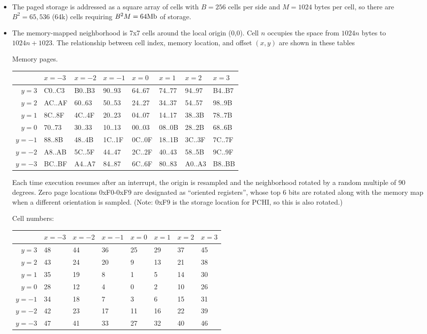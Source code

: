 \documentclass{article}
\begin{document}
  
  \begin{itemize}
  \item The paged storage is addressed as a square array of cells
    with $B=256$ cells per side and $M=1024$ bytes per cell,
    so there are $B^2 = 65,536$ (64k) cells requiring $B^2 M = 64\mathrm{Mb}$ of storage.
  \item The memory-mapped neighborhood is 7x7 cells around the local origin (0,0).
    Cell $n$ occupies the space from $1024n$ bytes to $1024n+1023$.
    The relationship between cell index, memory location, and offset $(x,y)$ are shown in these tables

    \noindent
    Memory pages.

    \noindent
 \begin{tabular}{r|lllllll}
        & $x=-3$ & $x=-2$ & $x=-1$ & $x=0$ & $x=1$ & $x=2$ & $x=3$ \\ \hline
 $y=3$ & C0..C3 & B0..B3 & 90..93 & 64..67 & 74..77 & 94..97 & B4..B7 \\
 $y=2$ & AC..AF & 60..63 & 50..53 & 24..27 & 34..37 & 54..57 & 98..9B \\
 $y=1$ & 8C..8F & 4C..4F & 20..23 & 04..07 & 14..17 & 38..3B & 78..7B \\
 $y=0$ & 70..73 & 30..33 & 10..13 & 00..03 & 08..0B & 28..2B & 68..6B \\
$y=-1$ & 88..8B & 48..4B & 1C..1F & 0C..0F & 18..1B & 3C..3F & 7C..7F \\
$y=-2$ & A8..AB & 5C..5F & 44..47 & 2C..2F & 40..43 & 58..5B & 9C..9F \\
$y=-3$ & BC..BF & A4..A7 & 84..87 & 6C..6F & 80..83 & A0..A3 & B8..BB
 \end{tabular}

 Each time execution resumes after an interrupt,
the origin is resampled and the neighborhood rotated by a random multiple of 90 degrees.
Zero page locations 0xF0-0xF9 are designated as ``oriented registers'',
whose top 6 bits are rotated along with the memory map when a different orientation is sampled.
(Note: 0xF9 is the storage location for PCHI, so this is also rotated.)

 \noindent
 Cell numbers:
 
 \noindent
 \begin{tabular}{r|lllllll}
       & $x=-3$ & $x=-2$ & $x=-1$ & $x=0$ & $x=1$ & $x=2$ & $x=3$ \\ \hline
 $y=3$ & 48 & 44 & 36 & 25 & 29 & 37 & 45 \\
 $y=2$ & 43 & 24 & 20 & 9 & 13 & 21 & 38 \\
 $y=1$ & 35 & 19 & 8 & 1 & 5 & 14 & 30 \\
 $y=0$ & 28 & 12 & 4 & 0 & 2 & 10 & 26 \\
$y=-1$ & 34 & 18 & 7 & 3 & 6 & 15 & 31 \\
$y=-2$ & 42 & 23 & 17 & 11 & 16 & 22 & 39 \\
$y=-3$ & 47 & 41 & 33 & 27 & 32 & 40 & 46
   \end{tabular}


\end{itemize}
\end{document}
